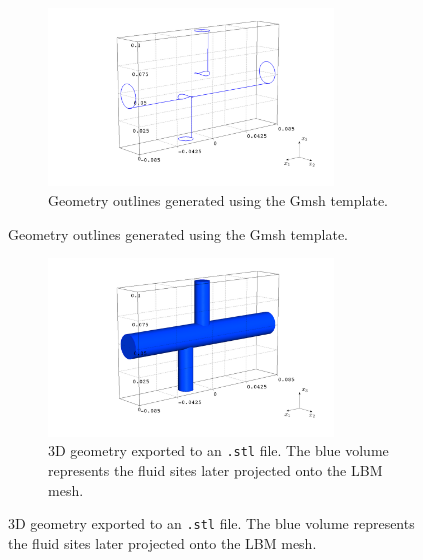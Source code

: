 \begin{figure}[H]
	\begin{subfigure}{0.99\textwidth}
		\centering
		\includegraphics[width=0.83\textwidth, trim={70mm 25mm 10mm 10mm}, clip]{figures/outline.png}
		\caption{Geometry outlines generated using the Gmsh template.}
		\label{fig:outline}
	\end{subfigure}
\end{figure}
\begin{figure}[H]\ContinuedFloat
	\begin{subfigure}{0.99\textwidth}
		\vspace{-10mm}
		\centering
		\includegraphics[width=0.83\textwidth, trim={70mm 25mm 10mm 10mm}, clip]{figures/stl.png}
		\caption{3D geometry exported to an \texttt{.stl} file. The blue volume represents the fluid sites later projected onto the LBM mesh.}
		\label{fig:stl file}
	\end{subfigure}
	\caption{3D geometry exported to an \texttt{.stl} file. The blue volume represents the fluid sites later projected onto the LBM mesh.}
\end{figure}
